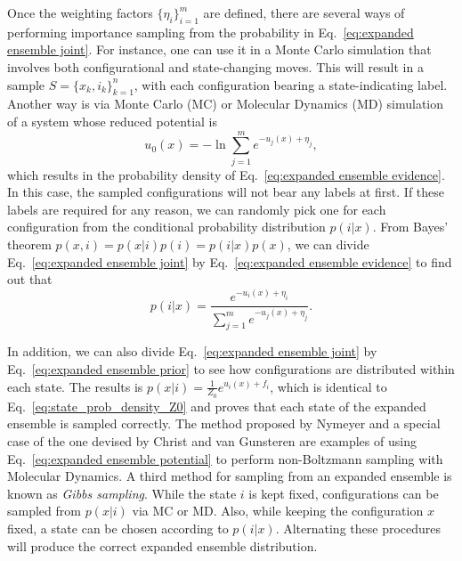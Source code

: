\documentclass[aip,jcp,preprint,amsmath,amssymb]{revtex4-1}
\begin{document}
Once the weighting factors $\{\eta_i\}_{i=1}^m$ are defined, there are several ways of performing importance sampling from the probability in Eq.~\eqref{eq:expanded ensemble joint}. For instance, one can use it in a Monte Carlo simulation that involves both configurational and state-changing moves.\cite{Lyubartsev_1992} This will result in a sample $S = \{x_k,i_k\}_{k=1}^n$, with each configuration bearing a state-indicating label. Another way is via Monte Carlo (MC) or Molecular Dynamics (MD) simulation of a system whose reduced potential is
\begin{equation}
\label{eq:expanded ensemble potential}
u_0(x) = - \ln \sum_{j=1}^m e^{-u_j(x) + \eta_j},
\end{equation}
which results in the probability density of Eq.~\eqref{eq:expanded ensemble evidence}. In this case, the sampled configurations will not bear any labels at first. If these labels are required for any reason, we can randomly pick one for each configuration from the conditional probability distribution $p(i|x)$.\cite{Nymeyer_2010} From Bayes' theorem $p(x,i) = p(x|i) p(i) = p(i|x) p(x)$, we can divide Eq.~\eqref{eq:expanded ensemble joint} by Eq.~\eqref{eq:expanded ensemble evidence} to find out that
\begin{equation}
\label{eq:expanded ensemble posterior}
p(i|x) = \frac{e^{-u_i(x) + \eta_i}}{\sum_{j=1}^m e^{-u_j(x) + \eta_j}}.
\end{equation}

In addition, we can also divide Eq.~\eqref{eq:expanded ensemble joint} by Eq.~\eqref{eq:expanded ensemble prior} to see how configurations are distributed within each state. The results is $p(x|i) = \frac{1}{Z_0} e^{u_i(x) + f_i}$, which is identical to Eq.~\eqref{eq:state_prob_density_Z0} and proves that each state of the expanded ensemble is sampled correctly. The method proposed by Nymeyer\cite{Nymeyer_2010} and a special case of the one devised by Christ and van Gunsteren\cite{Christ_2007, *Christ_2008, *Christ_2009} are examples of using Eq.~\eqref{eq:expanded ensemble potential} to perform non-Boltzmann sampling with Molecular Dynamics. A third method for sampling from an expanded ensemble is known as \textit{Gibbs sampling}.\cite{Chodera_2011} While the state $i$ is kept fixed, configurations can be sampled from $p(x|i)$ via MC or MD. Also, while keeping the configuration $x$ fixed, a state can be chosen according to $p(i|x)$. Alternating these procedures will produce the correct expanded ensemble distribution.\cite{Chodera_2011}
\end{document}
